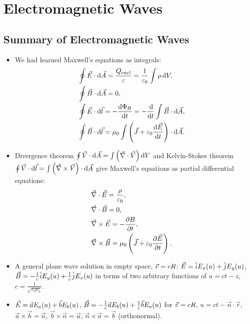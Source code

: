 \chapter{Electromagnetic Waves}

\section{Summary of Electromagnetic Waves}
\begin{itemize}
	\item We had learned Maxwell's equations as integrals:
	\begin{align}
	&\oint \Ev \cdot \di \vec{A} = \dfrac{Q_\text{encl}}{\varepsilon} = \dfrac{1}{\varepsilon_0} \int \rho \di V, \\
	&\oint \Bv \cdot \di\vec{A} = 0, \\
	&\oint \Ev \cdot \di \vec{l} = -\dfrac{\di \Phi_B}{\di t} = -\dfrac{\di}{\di t} \int \Bv \cdot \di \Av, \\
	&\oint \Bv \cdot \di\vec{l} = \mu_0 \int \bracks{ \vec{J} + \varepsilon_0 \dfrac{\di \Ev}{\di t} } \cdot \di \Av.
	\end{align}
	
	\item Divergence theorem $\oint \vec{V} \cdot \operatorname{d\!} \vec{A} = \int \left(  \vec{\nabla} \cdot \vec{V}  \right) \operatorname{d\!} V$ and Kelvin-Stokes theorem $\oint \vec{V} \cdot \operatorname{d\!} \vec{l} = \int \left(  \vec{\nabla} \times \vec{V}  \right) \cdot \operatorname{d\!} \vec{A}$ give Maxwell's equations as partial differential equations:
	\begin{align}
	& \vec{\nabla} \cdot \vec{E} = \frac{\rho}{\varepsilon_0}, \\
	& \vec{\nabla} \cdot \vec{B} = 0, \\
	& \vec{\nabla} \times \vec{E} = -\frac{\partial B}{\partial t}, \\
	& \vec{\nabla} \times \vec{B} = \mu_0 \left(  \vec{J} + \varepsilon_0 \dfrac{\partial \vec{E}}{\partial t}  \right).
	\end{align}
	
	\item A general plane wave solution in empty space, $\vec{v} = cR$: $\vec{E} = \hat{i} E_x(u) + \hat{j} E_y(u)$, $\vec{B} = -\frac{1}{c} \hat{i} E_y(u) + \frac{1}{c}\hat{j}E_x(u)$ in terms of two arbitrary functions of $u = ct-z$, $c = \frac{1}{\sqrt{\varepsilon_0\mu_0}}$.
	
	\item $\vec{E} = \vec{a} E_a(u) + \vec{b} E_b(u)$, $\vec{B} = -\frac{1}{c}\vec{a} E_b(u) +\frac{1}{c}\vec{b}E_a(u)$ for $\vec{v} = cR$, $u = ct - \vec{n}\cdot\vec{r}$, $\vec{a}\times\vec{b} = \vec{n}$, $\vec{b}\times\vec{n} = \vec{a}$, $\vec{n}\times\vec{a} = \vec{b}$ (orthonormal).
	

\end{itemize}
